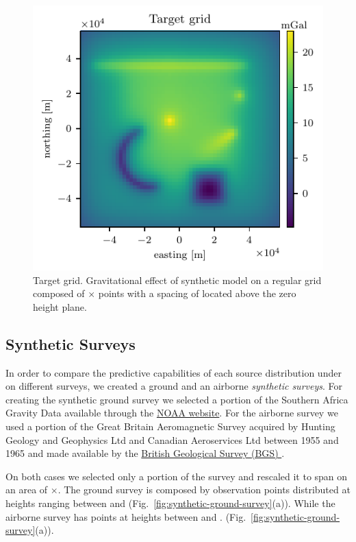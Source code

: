 \documentclass[twocolumn]{article}
\begin{document}
\begin{figure}
    \includegraphics[width=\linewidth]{figs/target-grid.pdf}
    \caption{
        Target grid. Gravitational effect of synthetic model on a regular grid
        composed of \TargetEastingSize{}$\times$\TargetNorthingSize{} points
        with a spacing of \TargetSpacing{} located \TargetHeight{} above the
        zero height plane.
    }
    \label{fig:target-grid}
\end{figure}

\subsection{Synthetic Surveys}

In order to compare the predictive capabilities of each source distribution
under on different surveys, we created a ground and an airborne \emph{synthetic
surveys}.
For creating the synthetic ground survey we selected a portion of the Southern
Africa Gravity Data available through the
\href{https://www.ngdc.noaa.gov/mgg/gravity/gravity.html}{NOAA website}.
For the airborne survey we used a portion of the Great Britain Aeromagnetic
Survey acquired by Hunting Geology and Geophysics Ltd and Canadian Aeroservices
Ltd between 1955 and 1965 and made available by the
\href{https://www.bgs.ac.uk/products/geophysics/aeromagneticRegional.html}{
British Geological Survey (BGS)
}.

On both cases we selected only a portion of the survey and rescaled it to span
on an area of \SurveyEasting{}$\times$\SurveyNorthing{}.
The ground survey is composed by \GroundSurveyPoints{} observation points
distributed at heights ranging between \GroundSurveyMinHeight{} and
\GroundSurveyMaxHeight{} (Fig.~\ref{fig:synthetic-ground-survey}(a)).
While the airborne survey has \AirborneSurveyPoints{} points at heights between
\AirborneSurveyMinHeight{} and \AirborneSurveyMaxHeight{}.
(Fig.~\ref{fig:synthetic-ground-survey}(a)).
\end{document}
